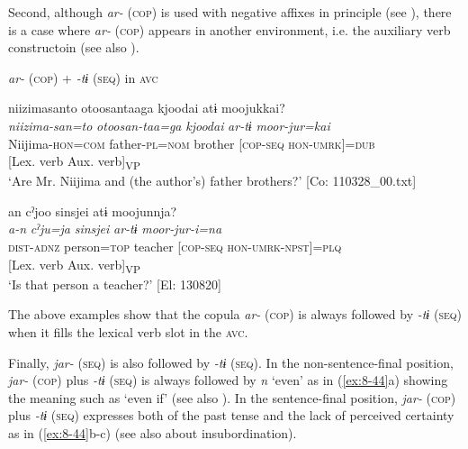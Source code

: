   Second, although \textit{ar-} (\textsc{cop}) is used with negative affixes in principle (see ), there is a case where \textit{ar-} (\textsc{cop}) appears in another environment, i.e. the auxiliary verb constructoin (see also ).

\ea\label{ex:8-43}
  \textit{ar-} (\textsc{cop}) + \textit{-tɨ} (\textsc{seq}) in \textsc{avc}

\ea
{\US}
\gllll   {\textbar}niizimasanto  otoosan{\textbar}taaga  {\textbar}kjoodai{\textbar}  atɨ  moojukkai?\\
\textit{niizima-san=to}  \textit{otoosan-taa=ga}  \textit{kjoodai}  \textit{ar-tɨ}  \textit{moor-jur=kai}\\
Niijima-\textsc{hon}=\textsc{com}  father-\textsc{pl}=\textsc{nom}  brother  [\textsc{cop}-\textsc{seq}  \textsc{hon}-\textsc{umrk}]=\textsc{dub}\\
            {}[Lex. verb  Aux. verb]\textsubscript{VP}\\
\glt ‘Are Mr. Niijima and (the author’s) father brothers?’ [Co: 110328\_00.txt]

\ex
{\TM}
\gllll  an  cˀjoo  sinsjei  atɨ  moojunnja?\\
\textit{a-n}  \textit{cˀju=ja}  \textit{sinsjei}  \textit{ar-tɨ}  \textit{moor-jur-i=na}\\
\textsc{dist}-\textsc{adnz}  person=\textsc{top}  teacher  [\textsc{cop}-\textsc{seq}  \textsc{hon}-\textsc{umrk}-\textsc{npst}]=\textsc{plq}\\
            {}[Lex. verb  Aux. verb]\textsubscript{VP}\\
\glt ‘Is that person a teacher?’ [El: 130820]

\z
\z

The above examples show that the copula \textit{ar-} (\textsc{cop}) is always followed by \textit{-tɨ} (\textsc{seq}) when it fills the lexical verb slot in the \textsc{avc}.

  Finally, \textit{jar-} (\textsc{seq}) is also followed by \textit{-tɨ} (\textsc{seq}). In the non-sentence-final position, \textit{jar-} (\textsc{cop}) plus \textit{-tɨ} (\textsc{seq}) is always followed by \textit{n} ‘even’ as in (\ref{ex:8-44}a) showing the meaning such as ‘even if’ (see also ). In the sentence-final position, \textit{jar-} (\textsc{cop}) plus \textit{-tɨ} (\textsc{seq}) expresses both of the past tense and the lack of perceived certainty as in (\ref{ex:8-44}b-c) (see also  about insubordination).

